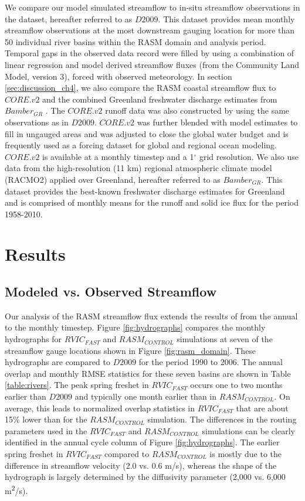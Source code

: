 We compare our model simulated streamflow to in-situ streamflow observations in the \citet{Dai_2009} dataset, hereafter referred to as $D2009$.
This dataset provides mean monthly streamflow observations at the most downstream gauging location for more than 50 individual river basins within the RASM domain and analysis period.
Temporal gaps in the observed data record were filled by \citet{Dai_2009} using a combination of linear regression and model derived streamflow fluxes (from the Community Land Model, version 3), forced with observed meteorology.
In section \ref{sec:discussion_ch4}, we also compare the RASM coastal streamflow flux to $CORE.v2$ \citep{Large_2009} and the combined Greenland freshwater discharge estimates from $Bamber_{GR}$ \citep{Bamber_2012}.
The $CORE.v2$ runoff data was also constructed by \citet{Dai_2009} using the same observations as in $D2009$.
$CORE.v2$ was further blended with model estimates to fill in ungauged areas and was adjusted to close the global water budget and is frequently used as a forcing dataset for global and regional ocean modeling.
$CORE.v2$ is available at a monthly timestep and a 1$^{\circ}$ grid resolution.
We also use data from the high-resolution (11 km) regional atmospheric climate model (RACMO2) applied over Greenland, hereafter referred to as $Bamber_{GR}$.
This dataset provides the best-known freshwater discharge estimates for Greenland and is comprised of monthly means for the runoff and solid ice flux for the period 1958-2010.

\section{Results}
\label{sec:results_ch4}

\subsection{Modeled vs. Observed Streamflow}
\label{sec:hydrographs}

Our analysis of the RASM streamflow flux extends the results of \citet{Hamman_2016a} from the annual to the monthly timestep.
Figure \ref{fig:hydrographs} compares the monthly hydrographs for $RVIC_{FAST}$ and $RASM_{CONTROL}$ simulations at seven of the streamflow gauge locations shown in Figure \ref{fig:rasm_domain}.
These hydrographs are compared to $D2009$ for the period 1990 to 2006.
The annual overlap and monthly RMSE statistics for these seven basins are shown in Table \ref{table:rivers}.
The peak spring freshet in $RVIC_{FAST}$ occurs one to two months earlier than $D2009$ and typically one month earlier than in $RASM_{CONTROL}$.
On average, this leads to normalized overlap statistics in $RVIC_{FAST}$ that are about 15\% lower than for the $RASM_{CONTROL}$ simulation.
The differences in the routing parameters used in the $RVIC_{FAST}$ and $RASM_{CONTROL}$ simulations can be clearly identified in the annual cycle column of Figure \ref{fig:hydrographs}.
The earlier spring freshet in $RVIC_{FAST}$ compared to $RASM_{CONTROL}$ is mostly due to the difference in streamflow velocity (2.0 vs. 0.6 m/s), whereas the shape of the hydrograph is largely determined by the diffusivity parameter (2,000 vs. 6,000 m\textsuperscript{2}/s).

